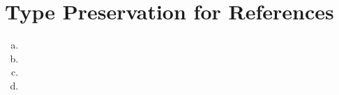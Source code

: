 \section{Type Preservation for References}

\begin{enumerate}[(a)]
\item
\item
\item
\item
\end{enumerate}

